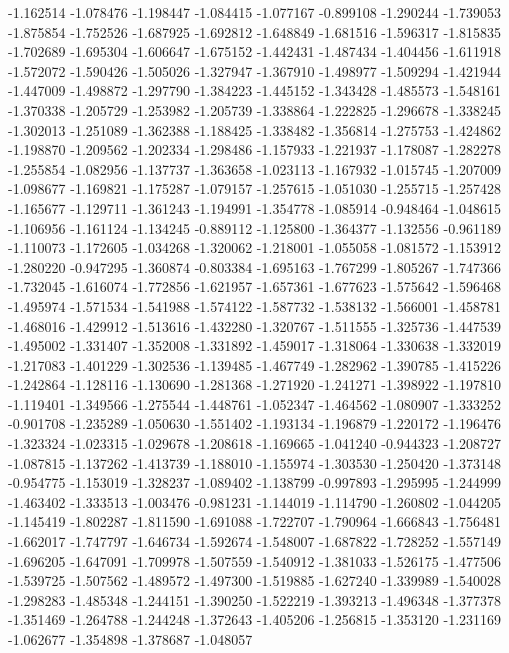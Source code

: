 -1.162514
-1.078476
-1.198447
-1.084415
-1.077167
-0.899108
-1.290244
-1.739053
-1.875854
-1.752526
-1.687925
-1.692812
-1.648849
-1.681516
-1.596317
-1.815835
-1.702689
-1.695304
-1.606647
-1.675152
-1.442431
-1.487434
-1.404456
-1.611918
-1.572072
-1.590426
-1.505026
-1.327947
-1.367910
-1.498977
-1.509294
-1.421944
-1.447009
-1.498872
-1.297790
-1.384223
-1.445152
-1.343428
-1.485573
-1.548161
-1.370338
-1.205729
-1.253982
-1.205739
-1.338864
-1.222825
-1.296678
-1.338245
-1.302013
-1.251089
-1.362388
-1.188425
-1.338482
-1.356814
-1.275753
-1.424862
-1.198870
-1.209562
-1.202334
-1.298486
-1.157933
-1.221937
-1.178087
-1.282278
-1.255854
-1.082956
-1.137737
-1.363658
-1.023113
-1.167932
-1.015745
-1.207009
-1.098677
-1.169821
-1.175287
-1.079157
-1.257615
-1.051030
-1.255715
-1.257428
-1.165677
-1.129711
-1.361243
-1.194991
-1.354778
-1.085914
-0.948464
-1.048615
-1.106956
-1.161124
-1.134245
-0.889112
-1.125800
-1.364377
-1.132556
-0.961189
-1.110073
-1.172605
-1.034268
-1.320062
-1.218001
-1.055058
-1.081572
-1.153912
-1.280220
-0.947295
-1.360874
-0.803384
-1.695163
-1.767299
-1.805267
-1.747366
-1.732045
-1.616074
-1.772856
-1.621957
-1.657361
-1.677623
-1.575642
-1.596468
-1.495974
-1.571534
-1.541988
-1.574122
-1.587732
-1.538132
-1.566001
-1.458781
-1.468016
-1.429912
-1.513616
-1.432280
-1.320767
-1.511555
-1.325736
-1.447539
-1.495002
-1.331407
-1.352008
-1.331892
-1.459017
-1.318064
-1.330638
-1.332019
-1.217083
-1.401229
-1.302536
-1.139485
-1.467749
-1.282962
-1.390785
-1.415226
-1.242864
-1.128116
-1.130690
-1.281368
-1.271920
-1.241271
-1.398922
-1.197810
-1.119401
-1.349566
-1.275544
-1.448761
-1.052347
-1.464562
-1.080907
-1.333252
-0.901708
-1.235289
-1.050630
-1.551402
-1.193134
-1.196879
-1.220172
-1.196476
-1.323324
-1.023315
-1.029678
-1.208618
-1.169665
-1.041240
-0.944323
-1.208727
-1.087815
-1.137262
-1.413739
-1.188010
-1.155974
-1.303530
-1.250420
-1.373148
-0.954775
-1.153019
-1.328237
-1.089402
-1.138799
-0.997893
-1.295995
-1.244999
-1.463402
-1.333513
-1.003476
-0.981231
-1.144019
-1.114790
-1.260802
-1.044205
-1.145419
-1.802287
-1.811590
-1.691088
-1.722707
-1.790964
-1.666843
-1.756481
-1.662017
-1.747797
-1.646734
-1.592674
-1.548007
-1.687822
-1.728252
-1.557149
-1.696205
-1.647091
-1.709978
-1.507559
-1.540912
-1.381033
-1.526175
-1.477506
-1.539725
-1.507562
-1.489572
-1.497300
-1.519885
-1.627240
-1.339989
-1.540028
-1.298283
-1.485348
-1.244151
-1.390250
-1.522219
-1.393213
-1.496348
-1.377378
-1.351469
-1.264788
-1.244248
-1.372643
-1.405206
-1.256815
-1.353120
-1.231169
-1.062677
-1.354898
-1.378687
-1.048057

